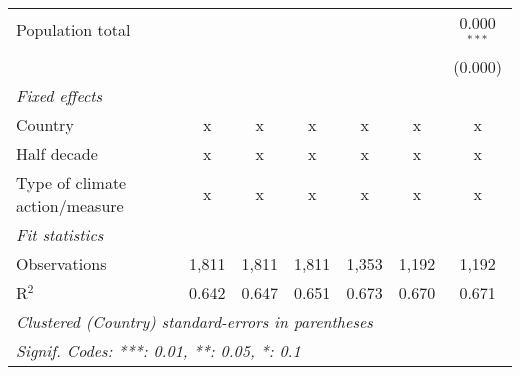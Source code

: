 \begin{tabular}{lcccccc}
   Population total                                              &         &                &                &                &                & 0.000$^{***}$\\   
                                                                 &         &                &                &                &                & (0.000)\\   
   \emph{Fixed effects}\\
   Country                                                       & x       & x              & x              & x              & x              & x\\  
   Half decade                                                   & x       & x              & x              & x              & x              & x\\  
   Type of climate action/measure                                & x       & x              & x              & x              & x              & x\\  
   \midrule \emph{Fit statistics}\\
   Observations                                                  & 1,811   & 1,811          & 1,811          & 1,353          & 1,192          & 1,192\\  
   R$^2$                                                         & 0.642   & 0.647          & 0.651          & 0.673          & 0.670          & 0.671\\  
   \midrule
   \multicolumn{7}{l}{\emph{Clustered (Country) standard-errors in parentheses}}\\
   \multicolumn{7}{l}{\emph{Signif. Codes: ***: 0.01, **: 0.05, *: 0.1}}\\
\end{tabular}
\par\endgroup


